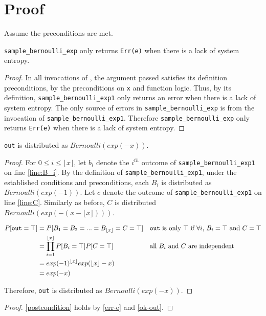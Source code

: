 \documentclass{article}
\begin{document}
\section{Proof}
Assume the preconditions are met.

\begin{lemma}
    \label{err-e}
    \texttt{sample\_bernoulli\_exp} only returns \texttt{Err(e)} when there is a lack of system entropy.
\end{lemma}

\begin{proof}
    In all invocations of , the argument passed satisfies its definition preconditions, 
    by the preconditions on \texttt{x} and function logic.
    Thus, by its definition, \texttt{sample\_bernoulli\_exp1} only returns an error when there is a lack of system entropy.
    The only source of errors in \texttt{sample\_bernoulli\_exp} is from the invocation of \texttt{sample\_bernoulli\_exp1}.
    Therefore \texttt{sample\_bernoulli\_exp} only returns \texttt{Err(e)} when there is a lack of system entropy.
\end{proof}

\begin{lemma}
    \label{ok-out}
    \texttt{out} is distributed as $Bernoulli(exp(-x))$.
\end{lemma}

\begin{proof}
    For $0 \le i \le \lfloor x \rfloor$, let $b_i$ denote the $i^{th}$ outcome of \texttt{sample\_bernoulli\_exp1} on line \ref{line:B_i}.
    By the definition of \texttt{sample\_bernoulli\_exp1}, under the established conditions and preconditions,
    each $B_i$ is distributed as $Bernoulli(exp(-1))$.
    Let $c$ denote the outcome of \texttt{sample\_bernoulli\_exp1} on line \ref{line:C}. 
    Similarly as before, $C$ is distributed $Bernoulli(exp(-(x - \lfloor x \rfloor)))$.

    \begin{align*}
        P[\texttt{out} = \top] &= P[B_1 = B_2 = ... = B_{\lfloor x \rfloor} = C = \top] && \text{\texttt{out} is only $\top$ if $\forall i$, $B_i = \top$ and $C = \top$} \\
        &= \prod_{i=1}^{\lfloor x \rfloor} P[B_i = \top] P[C = \top] && \text{all $B_i$ and $C$ are independent} \\
        &= exp(-1)^{\lfloor x \rfloor} exp(\lfloor x \rfloor - x) \\
        &= exp(-x)
    \end{align*}

    Therefore, \texttt{out} is distributed as $Bernoulli(exp(-x))$.
\end{proof}


\begin{proof}
    \ref{postcondition} holds by \ref{err-e} and \ref{ok-out}.
\end{proof}



\end{document}
